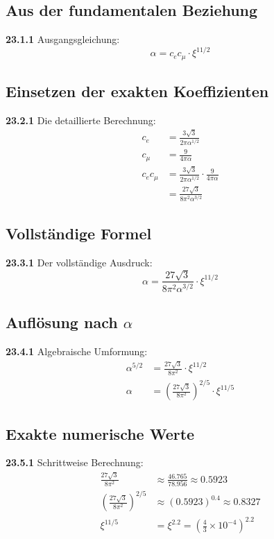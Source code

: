 \documentclass[12pt,a4paper]{article}
\begin{document}
\subsection{Aus der fundamentalen Beziehung}
\noindent \textbf{23.1.1} Ausgangsgleichung:
\begin{equation}
	\alpha = c_e c_\mu \cdot \xi^{11/2}
\end{equation}

\subsection{Einsetzen der exakten Koeffizienten}
\noindent \textbf{23.2.1} Die detaillierte Berechnung:
\begin{align}
	c_e &= \frac{3\sqrt{3}}{2\pi\alpha^{1/2}} \\
	c_\mu &= \frac{9}{4\pi\alpha} \\
	c_e c_\mu &= \frac{3\sqrt{3}}{2\pi\alpha^{1/2}} \cdot \frac{9}{4\pi\alpha} \\
	&= \frac{27\sqrt{3}}{8\pi^2\alpha^{3/2}}
\end{align}

\subsection{Vollständige Formel}
\noindent \textbf{23.3.1} Der vollständige Ausdruck:
\begin{equation}
	\alpha = \frac{27\sqrt{3}}{8\pi^2\alpha^{3/2}} \cdot \xi^{11/2}
\end{equation}

\subsection{Auflösung nach $\alpha$}
\noindent \textbf{23.4.1} Algebraische Umformung:
\begin{align}
	\alpha^{5/2} &= \frac{27\sqrt{3}}{8\pi^2} \cdot \xi^{11/2} \\
	\alpha &= \left(\frac{27\sqrt{3}}{8\pi^2}\right)^{2/5} \cdot \xi^{11/5}
\end{align}

\subsection{Exakte numerische Werte}
\noindent \textbf{23.5.1} Schrittweise Berechnung:
\begin{align}
	\frac{27\sqrt{3}}{8\pi^2} &\approx \frac{46.765}{78.956} \approx 0.5923 \\
	\left(\frac{27\sqrt{3}}{8\pi^2}\right)^{2/5} &\approx (0.5923)^{0.4} \approx 0.8327 \\
	\xi^{11/5} &= \xi^{2.2} = \left(\frac{4}{3} \times 10^{-4}\right)^{2.2}
\end{align}
\end{document}
